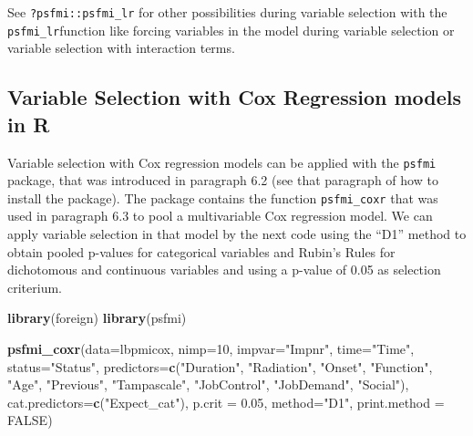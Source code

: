 \documentclass[]{book}
\newenvironment{Shaded}{\begin{snugshade}}{\end{snugshade}}
\newcommand{\KeywordTok}[1]{\textcolor[rgb]{0.13,0.29,0.53}{\textbf{#1}}}
\newcommand{\DataTypeTok}[1]{\textcolor[rgb]{0.13,0.29,0.53}{#1}}
\newcommand{\DecValTok}[1]{\textcolor[rgb]{0.00,0.00,0.81}{#1}}
\newcommand{\FloatTok}[1]{\textcolor[rgb]{0.00,0.00,0.81}{#1}}
\newcommand{\StringTok}[1]{\textcolor[rgb]{0.31,0.60,0.02}{#1}}
\newcommand{\OtherTok}[1]{\textcolor[rgb]{0.56,0.35,0.01}{#1}}
\newcommand{\NormalTok}[1]{#1}
\begin{document}
See \texttt{?psfmi::psfmi\_lr} for other possibilities during variable
selection with the \texttt{psfmi\_lr}function like forcing variables in
the model during variable selection or variable selection with
interaction terms.

\subsection{Variable Selection with Cox Regression models in
R}\label{variable-selection-with-cox-regression-models-in-r}

Variable selection with Cox regression models can be applied with the
\texttt{psfmi} package, that was introduced in paragraph 6.2 (see that
paragraph of how to install the package). The package contains the
function \texttt{psfmi\_coxr} that was used in paragraph 6.3 to pool a
multivariable Cox regression model. We can apply variable selection in
that model by the next code using the ``D1'' method to obtain pooled
p-values for categorical variables and Rubin's Rules for dichotomous and
continuous variables and using a p-value of 0.05 as selection criterium.

\begin{Shaded}
\begin{Highlighting}[]
\KeywordTok{library}\NormalTok{(foreign)}
\KeywordTok{library}\NormalTok{(psfmi)}

\KeywordTok{psfmi_coxr}\NormalTok{(}\DataTypeTok{data=}\NormalTok{lbpmicox, }\DataTypeTok{nimp=}\DecValTok{10}\NormalTok{, }\DataTypeTok{impvar=}\StringTok{"Impnr"}\NormalTok{, }\DataTypeTok{time=}\StringTok{"Time"}\NormalTok{, }\DataTypeTok{status=}\StringTok{"Status"}\NormalTok{,}
  \DataTypeTok{predictors=}\KeywordTok{c}\NormalTok{(}\StringTok{"Duration"}\NormalTok{, }\StringTok{"Radiation"}\NormalTok{, }\StringTok{"Onset"}\NormalTok{, }\StringTok{"Function"}\NormalTok{, }\StringTok{"Age"}\NormalTok{,}
  \StringTok{"Previous"}\NormalTok{, }\StringTok{"Tampascale"}\NormalTok{, }\StringTok{"JobControl"}\NormalTok{, }\StringTok{"JobDemand"}\NormalTok{, }\StringTok{"Social"}\NormalTok{), }
  \DataTypeTok{cat.predictors=}\KeywordTok{c}\NormalTok{(}\StringTok{"Expect_cat"}\NormalTok{), }\DataTypeTok{p.crit =} \FloatTok{0.05}\NormalTok{, }\DataTypeTok{method=}\StringTok{"D1"}\NormalTok{, }\DataTypeTok{print.method =} \OtherTok{FALSE}\NormalTok{)}
\end{Highlighting}
\end{Shaded}
\end{document}
